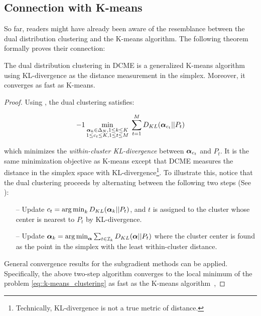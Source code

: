 \subsection{Connection with K-means}

So far, readers might have already been aware of the resemblance between the
dual distribution clustering and the K-means algorithm. The following theorem
formally proves their connection:

\begin{thm}
  The dual distribution clustering in DCME is a generalized K-means
  algorithm using KL-divergence as the distance measurement in the simplex.
  Moreover, it converges as fast as K-means.
\end{thm}
\begin{proof}
  Using , the dual clustering satisfies:

  \begin{alignat}{-1}
    \min\limits_{\substack{\valpha_k\in \Delta_N ,  1 \le k \le K \\
                           1 \le c_t \le K , 1 \le t \le M}} \;
  \sum\limits_{t=1}^M D_{KL}(\valpha_{c_t} || P_t) \label{eq::k-means_clustering}
  \end{alignat}

  which minimizes the \emph{within-cluster KL-divergence} between
  $\boldsymbol{\alpha}_{c_t}$ and $P_t$. It is the same minimization objective as K-means
  except that DCME measures the distance in the simplex space with
  KL-divergence\footnote{Technically, KL-divergence is not a true metric of
  distance.}. To illustrate this, notice that the dual clustering proceeds by
  alternating between the following two steps (See ):

\begin{itemize}
\item[--] Update $c_t = \operatorname*{arg\,min}_{k} D_{KL}(\boldsymbol{\alpha}_k || P_t)$, and $t$ is
  assigned to the cluster whose center is nearest to $P_t$ by KL-divergence.
\item[--] Update $\boldsymbol{\alpha}_k = \operatorname*{arg\,min}_{\boldsymbol{\alpha}} \sum_{t \in \mathcal{I}_k} D_{KL}(
  \boldsymbol{\alpha} || P_t)$ where the cluster center is found as the point in the simplex
  with the least within-cluster distance.
\end{itemize}

General convergence results for the subgradient methods can be applied.
Specifically, the above two-step algorithm converges to the local minimum of the
problem \eqref{eq::k-means_clustering} as fast as the K-means
algorithm~\cite{bottou1995convergence},
\end{proof}

